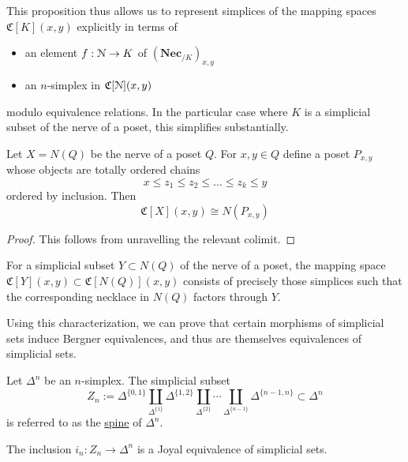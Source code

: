 \begin{note}
	This proposition thus allows us to represent simplices of the mapping spaces $\mathfrak{C}[K](x,y)$ explicitly in terms of 
	\begin{itemize}
		\item an element $f:\EuScript{N}\to K$ of $(\mathbf{Nec}_{/K})_{x,y}$
		\item an $n$-simplex in $\mathfrak{C}[\EuScript{N}](x,y)$ 
	\end{itemize}
	modulo equivalence relations. In the particular case where $K$ is a simplicial subset of the nerve of a poset, this simplifies substantially.
\end{note}

\begin{corollary}
	Let $X=N(Q)$ be the nerve of a poset $Q$. For $x,y\in Q$ define a poset $P_{x,y}$ whose objects are totally ordered chains 
	\[
	x\leq z_1\leq z_2\leq \ldots \leq z_k\leq y
	\]
	ordered by inclusion. Then 
	\[
	\mathfrak{C}[X](x,y)\cong N(P_{x,y}) 
	\]
\end{corollary}

\begin{proof}
	This follows from unravelling the relevant colimit.
\end{proof}

\begin{note}
	For a simplicial subset $Y\subset N(Q)$ of the nerve of a poset, the mapping space $\mathfrak{C}[Y](x,y)\subset \mathfrak{C}[N(Q)](x,y)$ consists of precisely those simplices such that the corresponding necklace in $N(Q)$ factors through $Y$. 
\end{note}

Using this characterization, we can prove that certain morphisms of simplicial sets induce Bergner equivalences, and thus are themselves equivalences of simplicial sets.  

\begin{definition}
	Let $\Delta^n$ be an $n$-simplex. The simplicial subset 
	\[
	Z_n:=\Delta^{\{0,1\}}\coprod_{\Delta^{\{1\}}} \Delta^{\{1,2\}}\coprod_{\Delta^{\{2\}}} \cdots \coprod_{\Delta^{\{n-1\}}} \Delta^{\{n-1,n\}}\subset \Delta^n 
	\]
	is referred to as the \underline{spine} of $\Delta^n$.
\end{definition}

\begin{lemma}
	The inclusion $i_n:Z_n\to \Delta^n$ is a Joyal equivalence of simplicial sets.  
\end{lemma} 

